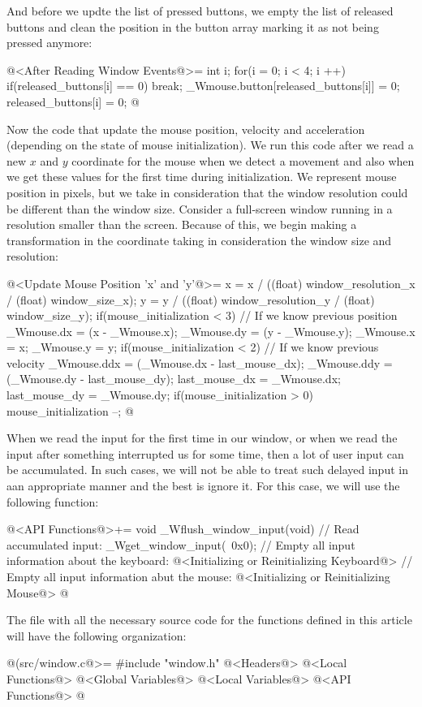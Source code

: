 And before we updte the list of pressed buttons, we empty the list of
released buttons and clean the position in the button array marking it
as not being pressed anymore:

\iniciocodigo
@<After Reading Window Events@>=
{
  int i;
  for(i = 0; i < 4; i ++){
    if(released_buttons[i] == 0)
      break;
    _Wmouse.button[released_buttons[i]] = 0;
    released_buttons[i] = 0;
  }
}
@
\fimcodigo

Now the code that update the mouse position, velocity and acceleration
(depending on the state of mouse initialization). We run this code
after we read a new $x$ and $y$ coordinate for the mouse when we
detect a movement and also when we get these values for the first time
during initialization. We represent mouse position in pixels, but we
take in consideration that the window resolution could be different
than the window size. Consider a full-screen window running in a
resolution smaller than the screen. Because of this, we begin making a
transformation in the coordinate taking in consideration the window
size and resolution:

\iniciocodigo
@<Update Mouse Position 'x' and 'y'@>=
{
  x = x / ((float) window_resolution_x / (float) window_size_x);
  y = y / ((float) window_resolution_y / (float) window_size_y);
  if(mouse_initialization < 3){ // If we know previous position
    _Wmouse.dx = (x - _Wmouse.x);
    _Wmouse.dy = (y - _Wmouse.y);
  }
  _Wmouse.x = x;
  _Wmouse.y = y;
  if(mouse_initialization < 2){ // If we know previous velocity
    _Wmouse.ddx = (_Wmouse.dx - last_mouse_dx);
    _Wmouse.ddy = (_Wmouse.dy - last_mouse_dy);
  }
  last_mouse_dx = _Wmouse.dx;
  last_mouse_dy = _Wmouse.dy;
  if(mouse_initialization > 0)
    mouse_initialization --;
}
@
\fimcodigo


When we read the input for the first time in our window, or when we
read the input after something interrupted us for some time, then a
lot of user input can be accumulated. In such cases, we will not be
able to treat such delayed input in aan appropriate manner and the
best is ignore it. For this case, we will use the following function:

\iniciocodigo
@<API Functions@>+=
void _Wflush_window_input(void){
  // Read accumulated input:
  _Wget_window_input(~0x0);
  // Empty all input information about the keyboard:
  @<Initializing or Reinitializing Keyboard@>
  // Empty all input information abut the mouse:
  @<Initializing or Reinitializing Mouse@>
}
@
\fimcodigo



The file with all the necessary source code for the functions defined
in this article will have the following organization:

\iniciocodigo
@(src/window.c@>=
#include "window.h"
@<Headers@>
@<Local Functions@>
@<Global Variables@>
@<Local Variables@>
@<API Functions@>
@
\fimcodigo


\fim

